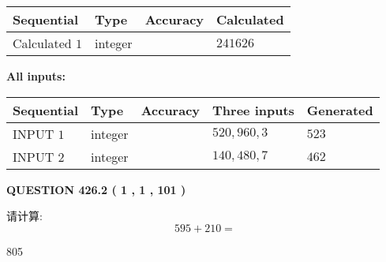 \documentclass{ctexart}
\begin{document}
   
   
   
\noindent{}
   
   
  
  
\noindent\begin{tabular}{|l|l|l|l|}
\hline
 Sequential & Type & Accuracy & Calculated \\ 
\hline
 
 
  Calculated $  1 $ & integer &  & 
  $ 241626 $ 
 \\  \hline  
 \end{tabular}
   
   
   
   
\noindent\vspace{0.1in}\hspace{-0.08in} {\textbf{\Large{All inputs: }}}
   
   
  
  
\noindent\begin{tabular}{|l|l|l|l|l|}
\hline
 Sequential & Type & Accuracy & Three inputs & Generated \\ 
\hline
 
 
  INPUT $  1 $ & integer &  & $
 520
 , 
 960
 , 
 3
 $ & $ 523 $ 
 \\  \hline  
 
 
  INPUT $  2 $ & integer &  & $
 140
 , 
 480
 , 
 7
 $ & $ 462 $ 
 \\  \hline  
 \end{tabular}
   
   
  
\vspace{0.2in}
  
{\textbf{\Large{QUESTION
426.2 
 ( 1 , 1 , 101 )
}}}
  
  
 
请计算:
\begin{equation}
595 +  %
210 = \nonumber
\end{equation}
 
 
 
\noindent{}
 
 

805
 
 
\noindent{}
 
 

 
 
 
\noindent{}
 
\end{document}
